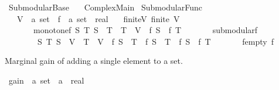 %
\begin{isabellebody}%
%
%
\isadelimtheory
%
\endisadelimtheory
%
\isatagtheory
{}\isamarkupfalse%
\ Submodular{\isacharunderscore}{\kern0pt}Base\isanewline
\ \ \ Complex{\isacharunderscore}{\kern0pt}Main\isanewline
{}%
\endisatagtheory
{\isafoldtheory}%
%
\isadelimtheory
\isanewline
%
\endisadelimtheory
\isanewline
{}\isamarkupfalse%
\ Submodular{\isacharunderscore}{\kern0pt}Func\ {\isacharequal}{\kern0pt}\isanewline
\ \ \ V\ {\isacharcolon}{\kern0pt}{\isacharcolon}{\kern0pt}\ {\isachardoublequoteopen}{\isacharprime}{\kern0pt}a\ set{\isachardoublequoteclose}\ \ f\ {\isacharcolon}{\kern0pt}{\isacharcolon}{\kern0pt}\ {\isachardoublequoteopen}{\isacharprime}{\kern0pt}a\ set\ {\isasymRightarrow}\ real{\isachardoublequoteclose}\isanewline
\ \ \ finite{\isacharunderscore}{\kern0pt}V{\isacharcolon}{\kern0pt}\ {\isachardoublequoteopen}finite\ V{\isachardoublequoteclose}\isanewline
\ \ \ \ \ \ \ monotone{\isacharunderscore}{\kern0pt}f{\isacharcolon}{\kern0pt}\ {\isachardoublequoteopen}{\isasymAnd}S\ T{\isachardot}{\kern0pt}\ S\ {\isasymsubseteq}\ T\ {\isasymLongrightarrow}\ T\ {\isasymsubseteq}\ V\ {\isasymLongrightarrow}\ f\ S\ {\isasymle}\ f\ T{\isachardoublequoteclose}\isanewline
\ \ \ \ \ \ \ submodular{\isacharunderscore}{\kern0pt}f{\isacharcolon}{\kern0pt}\isanewline
\ \ \ \ \ \ \ \ {\isachardoublequoteopen}{\isasymAnd}S\ T{\isachardot}{\kern0pt}\ S\ {\isasymsubseteq}\ V\ {\isasymLongrightarrow}\ T\ {\isasymsubseteq}\ V\ {\isasymLongrightarrow}\ f\ {\isacharparenleft}{\kern0pt}S\ {\isasymunion}\ T{\isacharparenright}{\kern0pt}\ {\isacharplus}{\kern0pt}\ f\ {\isacharparenleft}{\kern0pt}S\ {\isasyminter}\ T{\isacharparenright}{\kern0pt}\ {\isasymle}\ f\ S\ {\isacharplus}{\kern0pt}\ f\ T{\isachardoublequoteclose}\isanewline
\ \ \ \ \ \ \ f{\isacharunderscore}{\kern0pt}empty{\isacharcolon}{\kern0pt}\ {\isachardoublequoteopen}f\ {\isacharbraceleft}{\kern0pt}{\isacharbraceright}{\kern0pt}\ {\isacharequal}{\kern0pt}\ {}{\isachardoublequoteclose}\isanewline
{}%
\begin{isamarkuptext}%
Marginal gain of adding a single element to a set.%
\end{isamarkuptext}\isamarkuptrue%
\isamarkupfalse%
\ gain\ {\isacharcolon}{\kern0pt}{\isacharcolon}{\kern0pt}\ {\isachardoublequoteopen}{\isacharprime}{\kern0pt}a\ set\ {\isasymRightarrow}\ {\isacharprime}{\kern0pt}a\ {\isasymRightarrow}\ real{\isachardoublequoteclose}\ \isanewline

\end{isabellebody}
